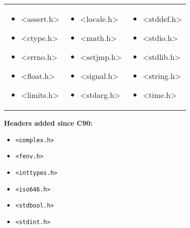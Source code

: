 \begin{tabular}{p{2.3cm} p{2.3cm} p{2.3cm}}
\begin{itemize}
\setlength{\itemsep}{0cm}
\setlength{\parskip}{0cm}
	\item \textless{}assert.h\textgreater{}
	\item \textless{}ctype.h\textgreater{}
	\item \textless{}errno.h\textgreater{}
	\item \textless{}float.h\textgreater{}
	\item \textless{}limits.h\textgreater{}
\end{itemize}
&
\begin{itemize}
\setlength{\itemsep}{0cm}
\setlength{\parskip}{0cm}
	\item \textless{}locale.h\textgreater{}
	\item \textless{}math.h\textgreater{}
	\item \textless{}setjmp.h\textgreater{}
	\item \textless{}signal.h\textgreater{}
	\item \textless{}stdarg.h\textgreater{}
\end{itemize}
&
\begin{itemize}
\setlength{\itemsep}{0cm}
\setlength{\parskip}{0cm}
	\item \textless{}stddef.h\textgreater{}
	\item \textless{}stdio.h\textgreater{}
	\item \textless{}stdlib.h\textgreater{}
	\item \textless{}string.h\textgreater{}
	\item \textless{}time.h\textgreater{}
\end{itemize}
\end{tabular}

\textbf{Headers added since C90:}
\begin{itemize}
\setlength{\itemsep}{0cm}
\setlength{\parskip}{0cm}
	\item \texttt{\textless{}complex.h\textgreater{}}
	\item \texttt{\textless{}fenv.h\textgreater{}}
	\item \texttt{\textless{}inttypes.h\textgreater{}}
\end{itemize}

\begin{itemize}
\setlength{\itemsep}{0cm}
\setlength{\parskip}{0cm}
	\item \texttt{\textless{}iso646.h\textgreater{}}
	\item \texttt{\textless{}stdbool.h\textgreater{}}
	\item \texttt{\textless{}stdint.h\textgreater{}}
\end{itemize}

